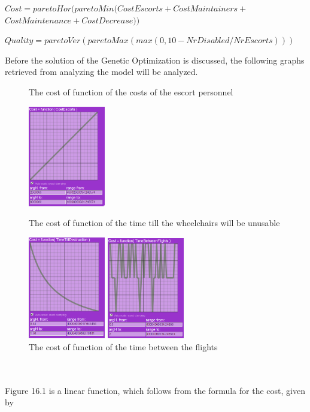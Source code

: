 \documentclass[a4paper, 11pt, notitlepage]{report}
\begin{document}
\begin{center}
\vspace{-4pt}$Cost=paretoHor(paretoMin(CostEscorts+CostMaintainers+$\\$CostMaintenance+CostDecrease))$
\end{center}
\begin{center}
\vspace{-8pt}$Quality=paretoVer(paretoMax(max(0,10-NrDisabled/NrEscorts)))$
\end{center}
\vspace{-4pt}Before the solution of the Genetic Optimization is discussed, the following graphs retrieved from analyzing the model will be analyzed.
\begin{figure}[!h]
\caption{The cost of function of the costs of the escort personnel}
\includegraphics[width=0.3\textwidth]{figures/cost(CE)}
\caption{The cost of function of the time till the wheelchairs will be unusable}
\includegraphics[width=0.3\textwidth]{figures/cost(TTD)}
\caption{The cost of function of the time between the flights}
\includegraphics[width=0.3\textwidth]{figures/cost(TBF)}
\end{figure}
\\ \\
Figure 16.1 is a linear function, which follows from the formula for the cost, given by
\end{document}
